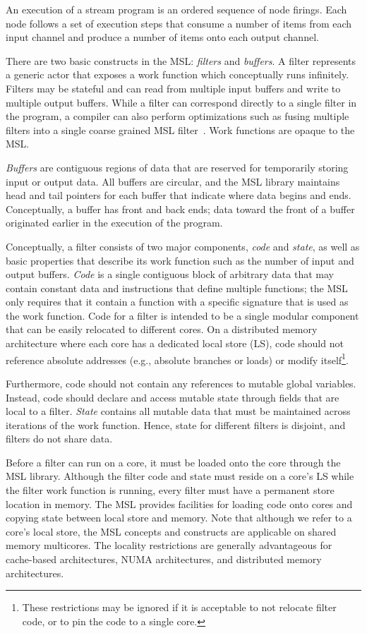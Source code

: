 An execution of a stream program is an ordered sequence of node
firings. Each node follows a set of execution steps that consume a
number of items from each input channel and produce a number of items
onto each output channel.

There are two basic constructs in the MSL: \emph{filters} and
\emph{buffers}. A filter represents a generic actor that exposes a
work function which conceptually runs infinitely. Filters may be
stateful and can read from multiple input buffers and write to multiple
output buffers. While a filter can correspond directly to a
single filter in the program, a compiler can also perform
optimizations such as fusing multiple filters into a single
coarse grained MSL filter~\cite{asplos02}. Work functions are opaque to the MSL.

\emph{Buffers} are contiguous regions of data that are reserved for
temporarily storing input or output data. All buffers are circular,
and the MSL library maintains head and tail pointers for each buffer
that indicate where data begins and ends. Conceptually, a buffer has
front and back ends; data toward the front of a buffer originated
earlier in the execution of the program.

Conceptually, a filter consists of two major components, \emph{code}
and \emph{state}, as well as basic properties that describe its work
function such as the number of input and output buffers. \emph{Code}
is a single contiguous block of arbitrary data that may contain
constant data and instructions that define multiple functions; the MSL
only requires that it contain a function with a specific signature
that is used as the work function. Code for a filter is intended to be
a single modular component that can be easily relocated to different
cores. On a distributed memory architecture where each core has a
dedicated local store (LS), code should not reference absolute
addresses (e.g., absolute branches or loads) or modify
itself\footnote{These restrictions may be ignored if it is acceptable
to not relocate filter code, or to pin the code to a single core.}.

Furthermore, code should not contain any references to mutable global
variables. Instead, code should declare and access mutable state
through fields that are local to a filter. \emph{State} contains all
mutable data that must be maintained across iterations of the work
function. Hence, state for different filters is disjoint, and filters
do not share data.

Before a filter can run on a core, it must be loaded onto the core
through the MSL library. Although the filter code and state must
reside on a core's LS while the filter work function is running, every
filter must have a permanent store location in memory. The MSL
provides facilities for loading code onto cores and copying state
between local store and memory. Note that although we refer to a
core's local store, the MSL concepts and constructs are applicable on
shared memory multicores. The locality restrictions are generally
advantageous for cache-based architectures, NUMA architectures, and
distributed memory architectures.

